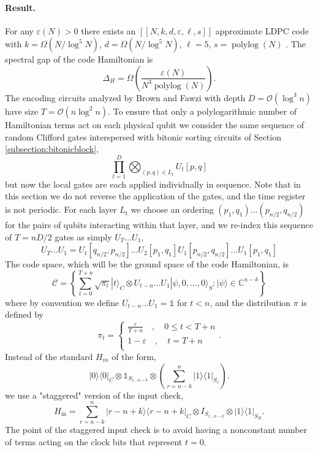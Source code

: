 \documentclass[11pt,letterpaper]{article}
\theoremstyle{definition}
\theoremstyle{remark}
\DeclareMathOperator{\polylog}{polylog}
\renewcommand{\leq}{\leqslant}
\numberwithin{equation}{section}
\let\origparagraph\paragraph
\renewcommand{\paragraph}[1]{\origparagraph{#1.}}
\theoremstyle{definition}
\newcommand{\ket}[1]{|#1\rangle}
\newcommand{\bra}[1]{\langle#1|}
\begin{document}
\paragraph{Result}For any $\varepsilon(N) > 0$ there exists an $[[N,k,d,\varepsilon,\ell,s]]$ approximate LDPC code with $k = \Omega(N/\log^5 N)$, $d = \Omega(N/\log^5 N)$, $\ell = 5$, $s = \polylog(N)$ .  The spectral gap of the code Hamiltonian is 
\begin{equation}
\Delta_H = \Omega \left(\frac{\varepsilon(N)}{N^3 \polylog(N)} \right).
\end{equation}
The encoding circuits analyzed by Brown and Fawzi with depth $D = \mathcal{O}(\log^3 n)$ have size $T = \mathcal{O}(n \log^2 n)$.  To ensure that only a polylogarithmic number of Hamiltonian terms act on each physical qubit we consider the same sequence of random Clifford gates interspersed with bitonic sorting circuits of Section \ref{subsection:bitonicblock},
\begin{equation}
  \prod_{t=1}^D \bigotimes_{(p,q) \in L_t} U_t[p,q]
\end{equation}
but now the local gates are each applied individually in sequence.  Note that in this section we do not reverse the application of the gates, and the time register is not periodic.  For each layer $L_t$ we choose an ordering $(p_1,q_1) ... (p_{n/2},q_{n/2})$ for the pairs of qubits interacting within that layer, and we re-index this sequence of $T = n D / 2$ gates as simply $U_T...U_1$,
\begin{equation}
   U_T...U_1 = U_t[q_{n/2},p_{n/2}]...U_2[p_1,q_1] U_1[p_{n/2},q_{n/2}] ... U_1[p_1,q_1]
\end{equation} 
The code space, which will be the ground space of the code Hamiltonian, is
\begin{equation}
\mathcal{C}  = \left \{  \sum_{t=0}^{T + n} \sqrt{\pi_t} \ket{t}_C \otimes U_{t-n}...U_1 \ket{\psi, 0,...,0}_S : \ket{\psi} \in \mathds{C}^{n-k} \right \}  \label{eq:globalCodeSpace}
\end{equation}
where by convention we define $U_{t - n} ... U_1 = \mathds{1}$ for $t < n$, and the distribution $\pi$ is defined by
\begin{equation}
\pi_t = \begin{cases}
\frac{\varepsilon}{T + n}\quad ,  \quad 0 \leq t < T + n\\
1- \varepsilon \quad , \quad t = T + n\\
\end{cases}.\label{eq:weights}
\end{equation} 
Instead of the standard $H_{in}$ of the form,
\begin{equation}
\ket{0}\bra{0}_C \otimes \mathds{1}_{S_{1...n-k}} \otimes \left(\sum_{r = n - k}^{n } \ket{1}\bra{1}_{S_r} \right).
\end{equation}
we use a "staggered" version of the input check,
\begin{equation}
H_{\textrm{in}} = \sum_{r = n-k}^n  \ket{r - n + k}\bra{r - n + k}_C \otimes I_{S_{1...n-k}} \otimes \ket{1}\bra{1}_{S_R}.
\end{equation}
The point of the staggered input check is to avoid having a nonconstant number of terms acting on the clock bits that represent $t = 0$.  
\end{document}
